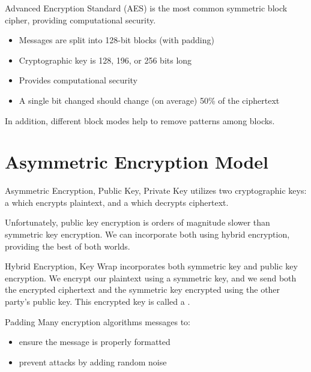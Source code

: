 \documentclass[code]{amznotes}
\begin{document}
\begin{dfnbox}{Advanced Encryption Standard (AES)}{}
     is the most common symmetric block cipher, providing computational security.
    \begin{itemize}[noitemsep]
        \item Messages are split into 128-bit blocks (with padding)
        \item Cryptographic key is 128, 196, or 256 bits long
        \item Provides computational security
        \item A single bit changed should change (on average) 50\% of the ciphertext
    \end{itemize}
    In addition, different block modes help to remove patterns among blocks.
\end{dfnbox}

\section{Asymmetric Encryption Model}

\begin{dfnbox}{Asymmetric Encryption, Public Key, Private Key}{}
     utilizes two cryptographic keys: a  which encrypts plaintext, and a  which decrypts ciphertext.
\end{dfnbox}

Unfortunately, public key encryption is orders of magnitude slower than symmetric key encryption. We can incorporate both using hybrid encryption, providing the best of both worlds.

\begin{dfnbox}{Hybrid Encryption, Key Wrap}{}
     incorporates both symmetric key and public key encryption. We encrypt our plaintext using a symmetric key, and we send both the encrypted ciphertext and the symmetric key encrypted using the other party's public key. This encrypted key is called a .
\end{dfnbox}

\begin{dfnbox}{Padding}{}
    Many encryption algorithms  messages to:
    \begin{itemize}[noitemsep]
        \item ensure the message is properly formatted
        \item prevent attacks by adding random noise
    \end{itemize}
\end{dfnbox}
\end{document}
